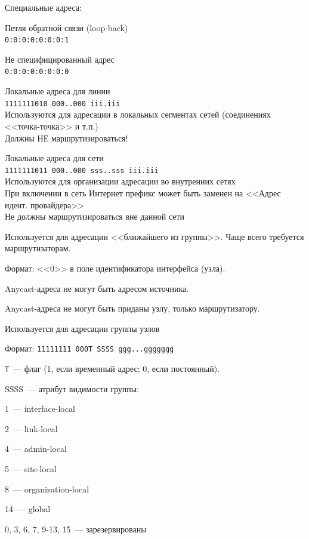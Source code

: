 Специальные адреса:
\begin{MyItemize}
    \item Петля обратной связи (loop-back)\\
    {\tt 0:0:0:0:0:0:0:1}
    \item Не специфицированный адрес\\
    {\tt 0:0:0:0:0:0:0:0}
    \item Локальные адреса для линии\\
    {\tt 1111111010 000..000 iii.iii}\\
    Используются для адресации в локальных сегментах сетей (соединениях <<точка-точка>> и т.п.)\\
    Должны НЕ маршрутизироваться!
    \item Локальные адреса для сети\\
    {\tt 1111111011 000..000 sss..sss iii.iii}\\
    Используются для организации адресации во внутренних сетях\\
    При включении в сеть Интернет префикс может быть заменен на <<Адрес идент. провайдера>>\\
    Не должны маршрутизироваться вне данной сети
\end{MyItemize}


Используется для адресации <<ближайшего из группы>>. Чаще всего требуется маршрутизаторам.

Формат: <<0>> в поле идентификатора интерфейса (узла).

Anycast-адреса не могут быть адресом источника.

Anycast-адреса не могут быть приданы узлу, только маршрутизатору.


Используется для адресации группы узлов

Формат: {\tt 11111111 000T SSSS ggg...ggggggg}

{\tt T}~--- флаг (1, если временный адрес; 0, если постоянный).

SSSS~--- атрибут видимости группы:
\begin{MyItemize}
    \item 1~--- interface-local
    \item 2~--- link-local
    \item 4~--- admin-local
    \item 5~--- site-local
    \item 8~--- organization-local
    \item 14~--- global
    \item 0, 3, 6, 7, 9-13, 15~--- зарезервированы
\end{MyItemize}

